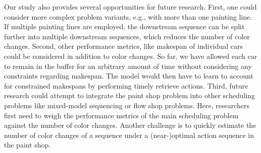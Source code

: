 \documentclass[11pt]{elsarticle}
\begin{document}
 

Our study also provides several opportunities for future research. First, one could consider more complex problem variants, e.g., with more than one painting line. If multiple painting lines are employed, the downstream sequence can be split further into multiple downstream sequences, which reduces the number of color changes. Second, other performance metrics, like makespan of individual cars could be considered in addition to color changes. So far, we have allowed each car to remain in the buffer for an arbitrary amount of time without considering any constraints regarding makespan. The model would then have to learn to account for constrained makespans by performing timely retrieve actions. Third, future research could attempt to integrate the paint shop problem into other scheduling problems like mixed-model sequencing or flow shop problems. Here, researchers first need to weigh the performance metrics of the main scheduling problem against the number of color changes. Another challenge is to quickly estimate the number of color changes of a sequence under a (near-)optimal action sequence in the paint shop. 

\singlespacing
\footnotesize
 

\end{document}
